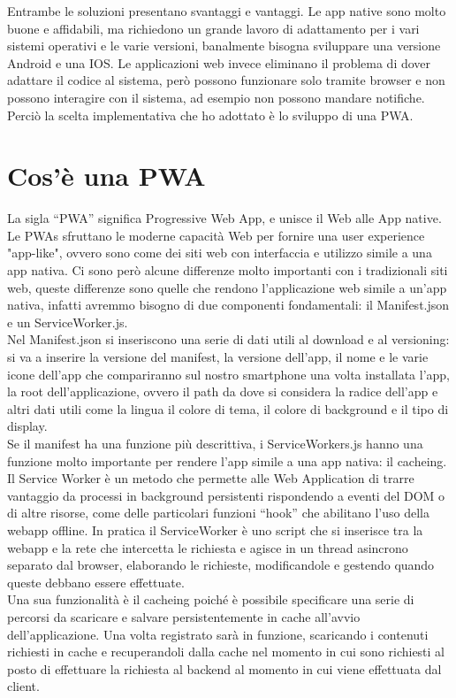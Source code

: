 \noindent
Entrambe le soluzioni presentano svantaggi e vantaggi. Le app native sono molto buone e affidabili, ma richiedono un grande lavoro di adattamento per i vari sistemi operativi e le varie versioni, banalmente bisogna sviluppare una versione Android e una IOS. Le applicazioni web invece eliminano il problema di dover adattare il codice al sistema, però possono funzionare solo tramite browser e non possono interagire con il sistema, ad esempio non possono mandare notifiche.\\
Perciò la scelta implementativa che ho adottato è lo sviluppo di una PWA.

\vspace{1cm}
\section{Cos’è una PWA}

La sigla “PWA” significa Progressive Web App, e unisce il Web alle App native. Le PWAs sfruttano le moderne capacità Web per fornire una user experience "app-like", ovvero sono come dei siti web con interfaccia e utilizzo simile a una app nativa. Ci sono però alcune differenze molto importanti con i tradizionali siti web, queste differenze sono quelle che rendono l’applicazione web simile a un’app nativa, infatti avremmo bisogno di due componenti fondamentali: il Manifest.json e un ServiceWorker.js.\\
Nel Manifest.json si  inseriscono una serie di dati utili al download e al versioning: si va a inserire la versione del manifest, la versione dell’app, il nome e le varie icone dell’app che compariranno sul nostro smartphone una volta installata l’app, la root dell’applicazione, ovvero il path da dove si considera la radice dell’app e altri dati utili come la lingua il colore di tema, il colore di background e il tipo di display.\\
Se il manifest ha una funzione più descrittiva, i ServiceWorkers.js hanno una funzione molto importante per rendere l’app simile a una app nativa: il cacheing. \\
Il Service Worker è un metodo che permette alle Web Application di trarre vantaggio da processi in background persistenti rispondendo a eventi del DOM o di altre risorse, come delle particolari funzioni “hook” che abilitano l’uso della webapp offline. In pratica il ServiceWorker è uno script che si inserisce tra la webapp e la rete che intercetta le richiesta e agisce in un thread asincrono separato dal browser, elaborando le richieste, modificandole e gestendo quando queste debbano essere effettuate.\\ 
Una sua funzionalità è il cacheing poiché è possibile specificare una serie di percorsi da scaricare e salvare persistentemente in cache all'avvio dell'applicazione. Una volta registrato sarà in funzione, scaricando i contenuti richiesti in cache e recuperandoli dalla cache nel momento in cui sono richiesti al posto di effettuare la richiesta al backend al momento in cui viene effettuata dal client.


